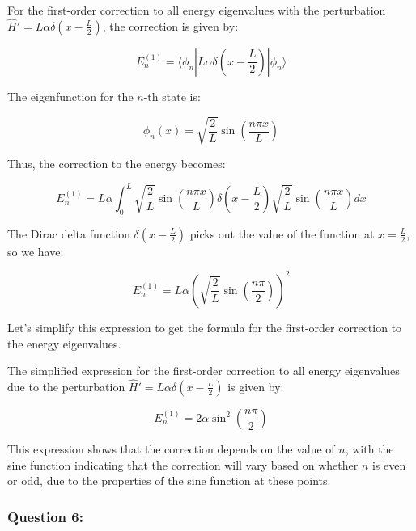 \documentclass[a4paper,11pt]{article}
\begin{document}
For the first-order correction to all energy eigenvalues with the perturbation \( \hat{H}' = L\alpha \delta\left(x - \frac{L}{2} \right) \), the correction is given by:

\[ E_{n}^{(1)} = \langle \phi_{n} | L\alpha \delta\left(x - \frac{L}{2} \right) | \phi_{n} \rangle \]

The eigenfunction for the \( n \)-th state is:

\[ \phi_{n}(x) = \sqrt{\frac{2}{L}} \sin\left(\frac{n \pi x}{L} \right) \]

Thus, the correction to the energy becomes:

\[ E_{n}^{(1)} = L\alpha \int_{0}^{L} \sqrt{\frac{2}{L}} \sin\left(\frac{n \pi x}{L}\right) \delta\left(x - \frac{L}{2} \right) \sqrt{\frac{2}{L}} \sin\left(\frac{n \pi x}{L}\right) dx \]

The Dirac delta function \( \delta\left(x - \frac{L}{2} \right) \) picks out the value of the function at \( x = \frac{L}{2} \), so we have:

\[ E_{n}^{(1)} = L\alpha \left(\sqrt{\frac{2}{L}} \sin\left(\frac{n \pi}{2}\right)\right)^{2} \]

Let's simplify this expression to get the formula for the first-order correction to the energy eigenvalues.

The simplified expression for the first-order correction to all energy eigenvalues due to the perturbation \( \hat{H}' = L\alpha \delta\left(x - \frac{L}{2} \right) \) is given by:

\[ E_{n}^{(1)} = 2\alpha \sin^{2}\left(\frac{n\pi}{2}\right) \]

This expression shows that the correction depends on the value of \( n \), with the sine function indicating that the correction will vary based on whether \( n \) is even or odd, due to the properties of the sine function at these points.

\subsubsection*{Question 6:}
\end{document}
